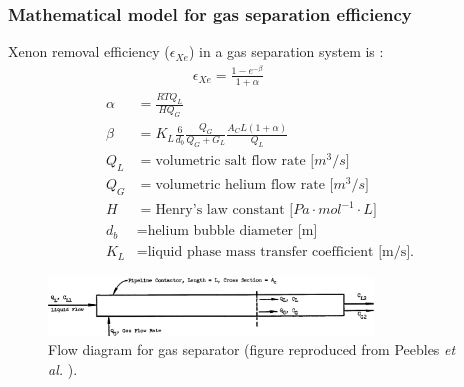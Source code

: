 \begin{frame}
  \frametitle{Mathematical model for gas separation efficiency}
  		\vspace{-1mm}
Xenon removal efficiency ($\epsilon_{Xe}$) in a gas separation system is 
\cite{peebles_removal_1968, sada_gas-liquid_1987}:
\begin{align}
& \qquad\qquad \epsilon_{Xe} = \frac{1-e^{-\beta}}{1+\alpha} \nonumber \\
\alpha &= \frac{RTQ_{L}}{HQ_{G}} \nonumber \\
\beta &= K_L \frac{6}{d_b} \frac{Q_G}{Q_G+G_L} \frac{A_C L (1+\alpha)}{Q_{L}} 
\nonumber \\
Q_{L}&= \mbox{volumetric salt flow rate [$m^3/s$]} \nonumber \\
Q_{G}&= \mbox{volumetric helium flow rate [$m^3/s$]} \nonumber \\
H &= \mbox{Henry's law constant [$Pa\cdot mol^{-1}\cdot L$]} \nonumber \\
d_b &= \mbox{helium bubble diameter [m]} \nonumber \\
K_L &= \mbox{liquid phase mass transfer coefficient [m/s].} \nonumber
\end{align}
		\vspace{-5mm}
  \begin{figure}[t]
	\includegraphics[width=0.77\textwidth]{./images/pipeline_contactor.png}
	\vspace{-2mm}
	\caption{Flow diagram for gas separator (figure reproduced from Peebles 
		\emph{et al.} \cite{peebles_removal_1968}).}
\end{figure}

\end{frame}


